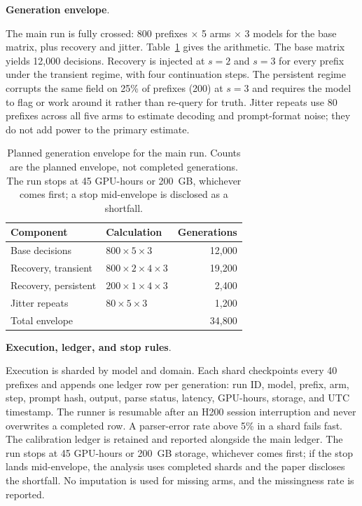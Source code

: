 \documentclass[a4paper,fleqn]{cas-sc}
\begin{document}
\noindent\textbf{Generation envelope}.\

The main run is fully crossed: 800 prefixes $\times$ 5 arms $\times$ 3 models for the base matrix,
plus recovery and jitter. Table~\ref{tab:envelope} gives the arithmetic. The base matrix yields
12{,}000 decisions. Recovery is injected at $s=2$ and $s=3$ for every prefix under the transient
regime, with four continuation steps. The persistent regime corrupts the same field on 25\% of
prefixes (200) at $s=3$ and requires the model to flag or work around it rather than re-query for
truth. Jitter repeats use 80 prefixes across all five arms to estimate decoding and prompt-format
noise; they do not add power to the primary estimate.

\begin{table}[pos=htbp]
  \centering
  \caption{Planned generation envelope for the main run. Counts are the planned envelope, not
  completed generations. The run stops at 45 GPU-hours or 200~GB, whichever comes first; a stop
  mid-envelope is disclosed as a shortfall.}
  \label{tab:envelope}
  \small
  \begin{tabular}{>{\raggedright\arraybackslash}p{5.2cm}>{\raggedright\arraybackslash}p{6.4cm}r}
    \toprule
    \textbf{Component} & \textbf{Calculation} & \textbf{Generations} \\
    \midrule
    Base decisions            & $800 \times 5 \times 3$                       & 12{,}000 \\
    Recovery, transient       & $800 \times 2 \times 4 \times 3$              & 19{,}200 \\
    Recovery, persistent      & $200 \times 1 \times 4 \times 3$              & 2{,}400 \\
    Jitter repeats            & $80 \times 5 \times 3$                        & 1{,}200 \\
    \midrule
    Total envelope            &                                               & 34{,}800 \\
    \bottomrule
  \end{tabular}
\end{table}

\noindent\textbf{Execution, ledger, and stop rules}.\

Execution is sharded by model and domain. Each shard checkpoints every 40 prefixes and appends
one ledger row per generation: run ID, model, prefix, arm, step, prompt hash, output, parse
status, latency, GPU-hours, storage, and UTC timestamp. The runner is resumable after an H200
session interruption and never overwrites a completed row. A parser-error rate above 5\% in a
shard fails fast. The calibration ledger is retained and reported alongside the main ledger. The
run stops at 45 GPU-hours or 200~GB storage, whichever comes first; if the stop lands
mid-envelope, the analysis uses completed shards and the paper discloses the shortfall. No
imputation is used for missing arms, and the missingness rate is reported.
\end{document}
